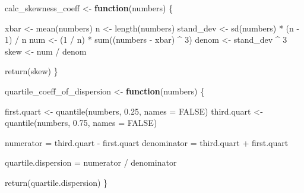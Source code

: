 \documentclass[]{article}
\newenvironment{Shaded}{\begin{snugshade}}{\end{snugshade}}
\newcommand{\AttributeTok}[1]{\textcolor[rgb]{0.77,0.63,0.00}{#1}}
\newcommand{\ConstantTok}[1]{\textcolor[rgb]{0.00,0.00,0.00}{#1}}
\newcommand{\ControlFlowTok}[1]{\textcolor[rgb]{0.13,0.29,0.53}{\textbf{#1}}}
\newcommand{\DecValTok}[1]{\textcolor[rgb]{0.00,0.00,0.81}{#1}}
\newcommand{\FloatTok}[1]{\textcolor[rgb]{0.00,0.00,0.81}{#1}}
\newcommand{\FunctionTok}[1]{\textcolor[rgb]{0.00,0.00,0.00}{#1}}
\newcommand{\NormalTok}[1]{#1}
\newcommand{\OtherTok}[1]{\textcolor[rgb]{0.56,0.35,0.01}{#1}}
\newcommand{\SpecialCharTok}[1]{\textcolor[rgb]{0.00,0.00,0.00}{#1}}
\begin{document}
\begin{Shaded}
\begin{Highlighting}[]
\NormalTok{calc\_skewness\_coeff }\OtherTok{\textless{}{-}} \ControlFlowTok{function}\NormalTok{(numbers) \{}
  
\NormalTok{  xbar }\OtherTok{\textless{}{-}} \FunctionTok{mean}\NormalTok{(numbers)}
\NormalTok{  n }\OtherTok{\textless{}{-}} \FunctionTok{length}\NormalTok{(numbers)}
\NormalTok{  stand\_dev }\OtherTok{\textless{}{-}} \FunctionTok{sd}\NormalTok{(numbers) }\SpecialCharTok{*}\NormalTok{ (n }\SpecialCharTok{{-}} \DecValTok{1}\NormalTok{) }\SpecialCharTok{/}\NormalTok{ n}
\NormalTok{  num }\OtherTok{\textless{}{-}}\NormalTok{ (}\DecValTok{1} \SpecialCharTok{/}\NormalTok{ n) }\SpecialCharTok{*} \FunctionTok{sum}\NormalTok{((numbers }\SpecialCharTok{{-}}\NormalTok{ xbar) }\SpecialCharTok{\^{}} \DecValTok{3}\NormalTok{)}
\NormalTok{  denom }\OtherTok{\textless{}{-}}\NormalTok{ stand\_dev }\SpecialCharTok{\^{}} \DecValTok{3}
\NormalTok{  skew }\OtherTok{\textless{}{-}}\NormalTok{ num }\SpecialCharTok{/}\NormalTok{ denom}
  
  \FunctionTok{return}\NormalTok{(skew)}
\NormalTok{\}}
\end{Highlighting}
\end{Shaded}

\begin{Shaded}
\begin{Highlighting}[]
\NormalTok{quartile\_coeff\_of\_dispersion }\OtherTok{\textless{}{-}} \ControlFlowTok{function}\NormalTok{(numbers) \{}
  
\NormalTok{  first.quart }\OtherTok{\textless{}{-}} \FunctionTok{quantile}\NormalTok{(numbers, }\FloatTok{0.25}\NormalTok{, }\AttributeTok{names =} \ConstantTok{FALSE}\NormalTok{)}
\NormalTok{  third.quart }\OtherTok{\textless{}{-}} \FunctionTok{quantile}\NormalTok{(numbers, }\FloatTok{0.75}\NormalTok{, }\AttributeTok{names =} \ConstantTok{FALSE}\NormalTok{)}
  
\NormalTok{  numerator }\OtherTok{=}\NormalTok{ third.quart }\SpecialCharTok{{-}}\NormalTok{ first.quart}
\NormalTok{  denominator }\OtherTok{=}\NormalTok{ third.quart }\SpecialCharTok{+}\NormalTok{ first.quart}
  
\NormalTok{  quartile.dispersion }\OtherTok{=}\NormalTok{ numerator }\SpecialCharTok{/}\NormalTok{ denominator}
  
  \FunctionTok{return}\NormalTok{(quartile.dispersion)}
\NormalTok{\}}
\end{Highlighting}
\end{Shaded}
\end{document}
